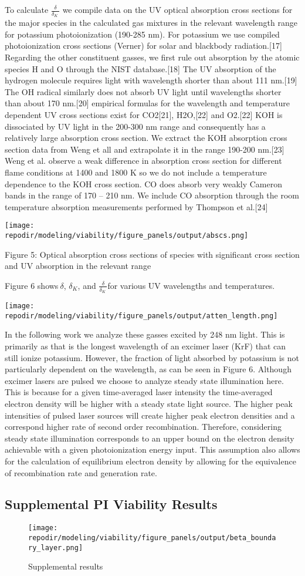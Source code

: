 To calculate \(\frac{\delta}{\delta_{K}\ }\) we compile data on the UV optical absorption cross sections for the major species in the calculated gas mixtures in the relevant wavelength range for potassium photoionization (190-285 nm). For potassium we use compiled photoionization cross sections (Verner) for solar and blackbody radiation.{[}17{]} Regarding the other constituent gasses, we first rule out absorption by the atomic species H and O through the NIST database.{[}18{]} The UV absorption of the hydrogen molecule requires light with wavelength shorter than about 111 nm.{[}19{]} The OH radical similarly does not absorb UV light until wavelengths shorter than about 170 nm.{[}20{]} empirical formulas for the wavelength and temperature dependent UV cross sections exist for CO2{[}21{]}, H2O,{[}22{]} and O2.{[}22{]} KOH is dissociated by UV light in the 200-300 nm range and consequently has a relatively large absorption cross section. We extract the KOH absorption cross section data from Weng et all and extrapolate it in the range 190-200 nm.{[}23{]} Weng et al. observe a weak difference in absorption cross section for different flame conditions at 1400 and 1800 K so we do not include a temperature dependence to the KOH cross section. CO does absorb very weakly Cameron bands in the range of 170 -- 210 nm. We include CO absorption through the room temperature absorption measurements performed by Thompson et al.{[}24{]}

\texttt{[image: \\repodir/modeling/viability/figure\_panels/output/abscs.png]}

Figure 5: Optical absorption cross sections of species with significant cross section and UV absorption in the relevant range

Figure 6 shows\(\ \delta\), \(\delta_{K}\), and \(\frac{\delta}{\delta_{K}\ }\)for various UV wavelengths and temperatures.

\texttt{[image: \\repodir/modeling/viability/figure\_panels/output/atten\_length.png]}


In the following work we analyze these gasses excited by 248 nm light. This is primarily as that is the longest wavelength of an excimer laser (KrF) that can still ionize potassium. However, the fraction of light absorbed by potassium is not particularly dependent on the wavelength, as can be seen in Figure 6. Although excimer lasers are pulsed we choose to analyze steady state illumination here. This is because for a given time-averaged laser intensity the time-averaged electron density will be higher with a steady state light source. The higher peak intensities of pulsed laser sources will create higher peak electron densities and a correspond higher rate of second order recombination. Therefore, considering steady state illumination corresponds to an upper bound on the electron density achievable with a given photoionization energy input. This assumption also allows for the calculation of equilibrium electron density by allowing for the equivalence of recombination rate and generation rate.

\clearpage

\subsection{Supplemental PI Viability Results}

\begin{figure}
\centering
\texttt{[image: \\repodir/modeling/viability/figure\_panels/output/beta\_boundary\_layer.png]}
\caption{Supplemental results}
\end{figure}
